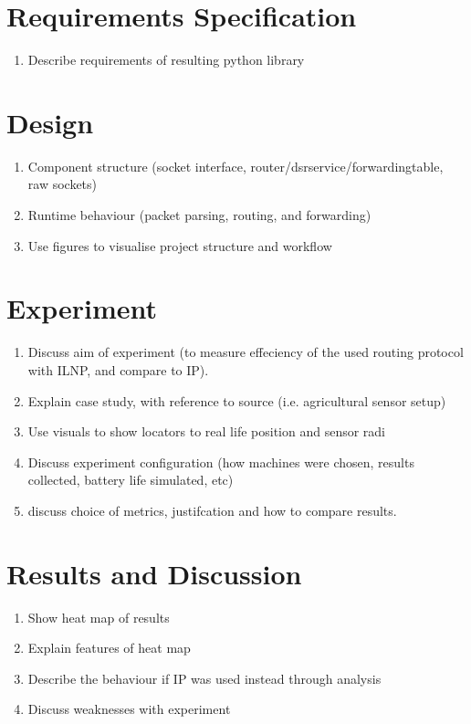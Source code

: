 \documentclass[12pt]{article}
\begin{document}
\section{Requirements Specification}

\begin{enumerate}
\item Describe requirements of resulting python library
\end{enumerate}

\section{Design}

\begin{enumerate}
\item Component structure (socket interface, router/dsrservice/forwardingtable, raw sockets)
\item Runtime behaviour (packet parsing, routing, and forwarding)
\item Use figures to visualise project structure and workflow
\end{enumerate}

\section{Experiment}

\begin{enumerate}
\item Discuss aim of experiment (to measure effeciency of the used routing protocol with ILNP, and compare to IP).
\item Explain case study, with reference to source (i.e. agricultural sensor setup)
\item Use visuals to show locators to real life position and sensor radi
\item Discuss experiment configuration (how machines were chosen, results collected, battery life simulated, etc)
\item discuss choice of metrics, justifcation and how to compare results.
\end{enumerate}

\section{Results and Discussion}

\begin{enumerate}
\item Show heat map of results
\item Explain features of heat map
\item Describe the behaviour if IP was used instead through analysis
\item Discuss weaknesses with experiment
\end{enumerate}
\end{document}
